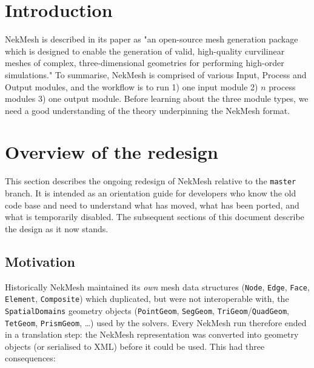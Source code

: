 


% 

\section{Introduction}
NekMesh is described in its paper \cite{NekMesh_paper} as "an
open-source mesh generation package which is designed to enable the
generation of valid, high-quality curvilinear meshes of complex,
three-dimensional geometries for performing high-order simulations."
To summarise, NekMesh is comprised of various Input, Process and
Output modules, and the workflow is to run 1) one input module 2) $n$
process modules 3) one output module. Before learning about the three
module types, we need a good understanding of the theory underpinning
the NekMesh format.

\section{Overview of the redesign}
\label{sect:redesign_overview}
This section describes the ongoing redesign of NekMesh relative to the
\texttt{master} branch. It is intended as an orientation guide for
developers who know the old code base and need to understand what has
moved, what has been ported, and what is temporarily disabled. The
subsequent sections of this document describe the design as it now
stands.

\subsection{Motivation}
Historically NekMesh maintained its \textit{own} mesh data structures
(\texttt{Node}, \texttt{Edge}, \texttt{Face}, \texttt{Element},
\texttt{Composite}) which duplicated, but were not interoperable with,
the \texttt{SpatialDomains} geometry objects (\texttt{PointGeom},
\texttt{SegGeom}, \texttt{TriGeom}/\texttt{QuadGeom},
\texttt{TetGeom}, \texttt{PrismGeom}, \ldots) used by the solvers. Every
NekMesh run therefore ended in a translation step: the NekMesh
representation was converted into geometry objects (or serialised to
XML) before it could be used. This had three consequences:

